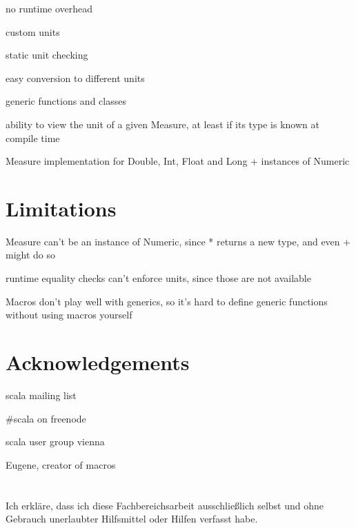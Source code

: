\documentclass[12pt,oneside,a4paper]{scrbook}
\theoremstyle{definition}
\begin{document}
no runtime overhead

custom units

static unit checking

easy conversion to different units

generic functions and classes

ability to view the unit of a given Measure, at least if its type is known at compile time

Measure implementation for Double, Int, Float and Long + instances of Numeric

\chapter{Limitations}

Measure can't be an instance of Numeric, since * returns a new type, and even + might do so

runtime equality checks can't enforce units, since those are not available

Macros don't play well with generics, so it's hard to define generic functions without using macros yourself

\chapter{Acknowledgements}
scala mailing list

#scala on freenode

scala user group vienna

Eugene, creator of macros


\singlespacing

{}

\chapter*{}
\onehalfspacing
Ich erkläre, dass ich diese Fachbereichsarbeit ausschließlich selbst und ohne Gebrauch unerlaubter Hilfsmittel oder Hilfen verfasst habe.
\end{document}
